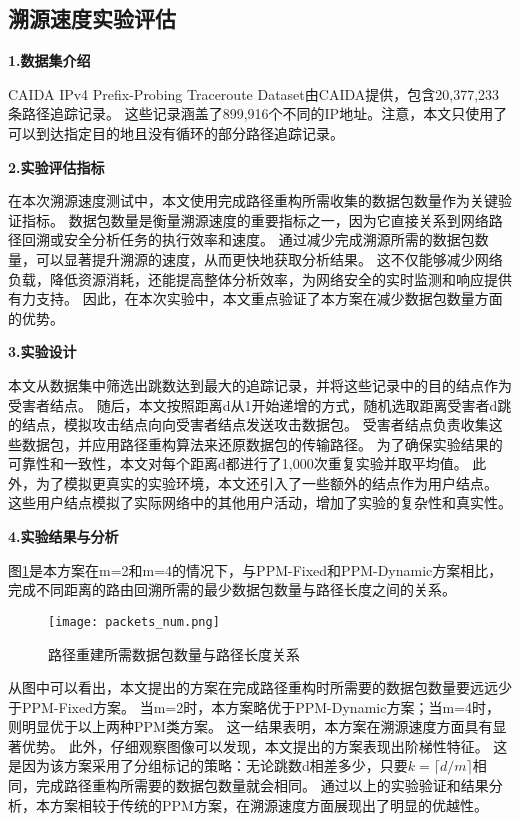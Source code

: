 \subsection{溯源速度实验评估}
\textbf{1.数据集介绍}\par
CAIDA IPv4 Prefix-Probing Traceroute Dataset由CAIDA提供，包含20,377,233条路径追踪记录。
这些记录涵盖了899,916个不同的IP地址。注意，本文只使用了可以到达指定目的地且没有循环的部分路径追踪记录。\par
\textbf{2.实验评估指标}\par
在本次溯源速度测试中，本文使用完成路径重构所需收集的数据包数量作为关键验证指标。
数据包数量是衡量溯源速度的重要指标之一，因为它直接关系到网络路径回溯或安全分析任务的执行效率和速度。
通过减少完成溯源所需的数据包数量，可以显著提升溯源的速度，从而更快地获取分析结果。
这不仅能够减少网络负载，降低资源消耗，还能提高整体分析效率，为网络安全的实时监测和响应提供有力支持。
因此，在本次实验中，本文重点验证了本方案在减少数据包数量方面的优势。\par

\textbf{3.实验设计}\par
本文从数据集中筛选出跳数达到最大的追踪记录，并将这些记录中的目的结点作为受害者结点。
随后，本文按照距离d从1开始递增的方式，随机选取距离受害者d跳的结点，模拟攻击结点向向受害者结点发送攻击数据包。
受害者结点负责收集这些数据包，并应用路径重构算法来还原数据包的传输路径。
为了确保实验结果的可靠性和一致性，本文对每个距离d都进行了1,000次重复实验并取平均值。
此外，为了模拟更真实的实验环境，本文还引入了一些额外的结点作为用户结点。
这些用户结点模拟了实际网络中的其他用户活动，增加了实验的复杂性和真实性。\par

\textbf{4.实验结果与分析}\par
图\ref{fig:packets_num}是本方案在m=2和m=4的情况下，与PPM-Fixed和PPM-Dynamic方案相比，完成不同距离的路由回溯所需的最少数据包数量与路径长度之间的关系。
\begin{figure}[htbp]
	\centering
	\texttt{[image: packets\_num.png]}
	\caption{路径重建所需数据包数量与路径长度关系}
	\label{fig:packets_num}
\end{figure}
从图中可以看出，本文提出的方案在完成路径重构时所需要的数据包数量要远远少于PPM-Fixed方案。
当m=2时，本方案略优于PPM-Dynamic方案；当m=4时，则明显优于以上两种PPM类方案。
这一结果表明，本方案在溯源速度方面具有显著优势。
此外，仔细观察图像可以发现，本文提出的方案表现出阶梯性特征。
这是因为该方案采用了分组标记的策略：无论跳数d相差多少，只要$k=\lceil d/m \rceil$相同，完成路径重构所需要的数据包数量就会相同。
通过以上的实验验证和结果分析，本方案相较于传统的PPM方案，在溯源速度方面展现出了明显的优越性。\par

